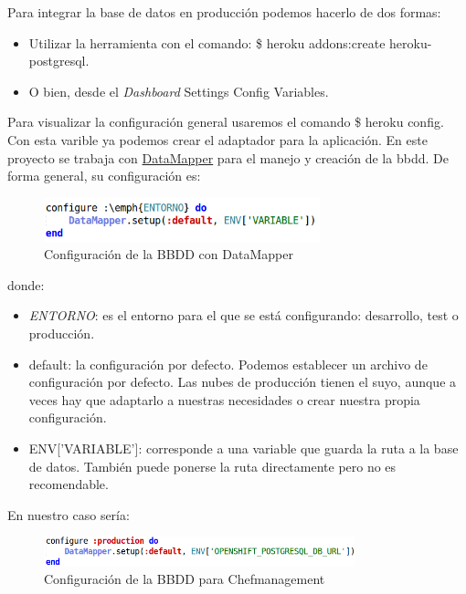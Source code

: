 Para integrar la base de datos en producción podemos hacerlo de dos formas:
\begin{itemize}
	\item Utilizar la herramienta con el comando: \$ heroku addons:create heroku-postgresql.
	\item O bien, desde el \emph{Dashboard} \rightarrow Settings \rightarrow Config Variables.
\end{itemize}

Para visualizar la configuración general usaremos el comando \$ heroku config. Con esta varible ya podemos crear el adaptador para la aplicación. En este proyecto se trabaja con \href{http://datamapper.org/}{DataMapper} para el manejo y creación de la bbdd. De forma general, su configuración es: \\

\begin{figure}[H]
	\centering
	\includegraphics[width=8cm]{./images/env01.png}
	\caption{Configuración de la BBDD con DataMapper} \label{fig:env01}
\end{figure}
 
 donde:
 \begin{itemize}
	 \item \emph{ENTORNO}: es el entorno para el que se está configurando: desarrollo, test o producción.
	\item default: la configuración por defecto. Podemos establecer un archivo de configuración por defecto. Las nubes de producción tienen el suyo, aunque a veces hay que adaptarlo a nuestras necesidades o crear nuestra propia configuración.
	\item ENV['VARIABLE']: corresponde a una variable que guarda la ruta a la base de datos. También puede ponerse la ruta directamente pero no es recomendable.
\end{itemize}

En nuestro caso sería: \\

\begin{figure}[H]
	\centering
	\includegraphics[width=9cm]{./images/env02.png}
	\caption{Configuración de la BBDD para Chefmanagement} \label{fig:env02}
\end{figure}

